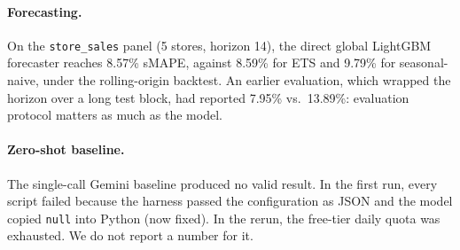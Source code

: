 \paragraph{Forecasting.} On the \texttt{store\_sales} panel (5 stores, horizon 14), the direct global LightGBM forecaster reaches 8.57\% sMAPE, against 8.59\% for ETS and 9.79\% for seasonal-naive, under the rolling-origin backtest. An earlier evaluation, which wrapped the horizon over a long test block, had reported 7.95\% vs.\ 13.89\%: evaluation protocol matters as much as the model.

\paragraph{Zero-shot baseline.} The single-call Gemini baseline produced no valid result. In the first run, every script failed because the harness passed the configuration as JSON and the model copied \texttt{null} into Python (now fixed). In the rerun, the free-tier daily quota was exhausted. We do not report a number for it.
